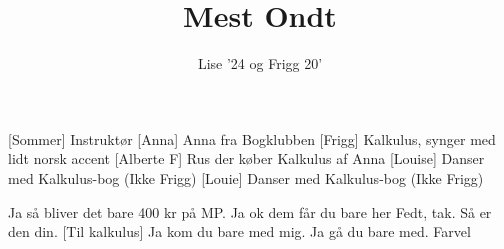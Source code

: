 \documentclass[a4paper,11pt]{article}
\title{Mest Ondt}
\author{Lise '24 og Frigg 20'}
\begin{document}
\maketitle

\begin{roles}
[Sommer] Instruktør
[Anna] Anna fra Bogklubben
[Frigg] Kalkulus, synger med lidt norsk accent
[Alberte F] Rus der køber Kalkulus af Anna
[Louise] Danser med Kalkulus-bog (Ikke Frigg)
[Louie] Danser med Kalkulus-bog (Ikke Frigg)
\end{roles}

\begin{sketch}
 Ja så bliver det bare 400 kr på MP.
 Ja ok dem får du bare her 
 Fedt, tak. Så er den din.
[Til kalkulus] Ja kom du bare med mig.
 Ja gå du bare med. Farvel 
\end{sketch}
\end{document}
